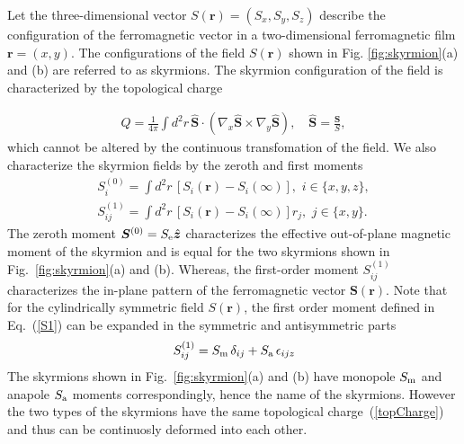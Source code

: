 \documentclass[twocolumn,showpacs,floatfix,nofootinbib,longbibliography]{revtex4-1}
\begin{document}
Let the three-dimensional vector $S(\bm r) = (S_x,S_y,S_z)$ describe the configuration of the ferromagnetic vector in a two-dimensional ferromagnetic film $\bm r = (x,y)$. The configurations of the field $S(\bm r)$ shown in Fig. \ref{fig:skyrmion}(a) and (b) are referred to as skyrmions. The skyrmion configuration of the field is characterized by the topological charge

\begin{align}
	Q = \frac{1}{4\pi} \int d^2r \, \hat {\bm S}\cdot (\nabla_x\hat {\bm S}\times\nabla_y\hat {\bm S}), \quad \hat {\bm S}= \frac{\bm S}{S},
	\label{topCharge}
\end{align}
which cannot be altered by the continuous transfomation of the field.  We also characterize the skyrmion fields by the zeroth and first moments
\begin{align}
	S^{(0)}_i = \int  d^2r \, \left[S_i(\bm r)-S_i(\infty)\right],\,\, i\in \{x,y,z\}, \label{S0} \\
	S^{(1)}_{ij} = \int  d^2r \, \left[S_i(\bm r)-S_i(\infty)\right] r_j,\,\, j\in \{x,y\}. \label{S1}
\end{align}
The zeroth moment $\bm S^{(0)} = S_{\rm e} \hat{\bm z}$ characterizes the effective out-of-plane magnetic moment of the skyrmion and is equal for the two skyrmions shown in Fig.~{\ref{fig:skyrmion}}(a) and (b). Whereas, the first-order moment $S^{(1)}_{ij}$ characterizes the in-plane pattern of the ferromagnetic vector $\bm S(\bm r)$. Note that for the cylindrically symmetric field $S(\bm r)$, the first order moment defined in Eq.~(\ref{S1}) can be expanded in the symmetric and antisymmetric parts
\begin{equation}
	S^{(1)}_{ij}=S_{\rm m}\,\delta_{ij} + S_{\rm a}\,\epsilon_{ijz}
\end{equation}
The skyrmions shown in Fig.~\ref{fig:skyrmion}(a) and (b) have monopole $S_{\rm m}$ and anapole $S_{\rm a}$ moments correspondingly, hence the name of the skyrmions. However the two types of the skyrmions have the same topological charge~(\ref{topCharge}) and thus can be continuosly deformed into each other.

\end{document}
